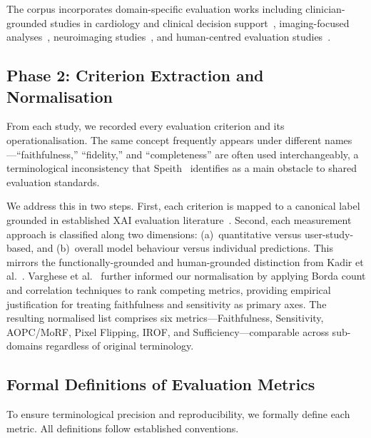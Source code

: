 The corpus incorporates domain-specific evaluation works including clinician-grounded studies in cardiology and clinical decision support~\cite{Vazquez2021,Piculin2022,Nurmaini2022,MorenoSanchez2023,Pandey2024}, imaging-focused analyses~\cite{Lee2021Cardiomegaly,palatnik2021xai,Repetto2025EvaluatingTR,Pertuz2023,Patricio2024}, neuroimaging studies~\cite{Nazir2024UtilizingCC,Chmiel2023,Kohan2025}, and human-centred evaluation studies~\cite{IhongbeFouad2024,11355720}.

\subsection{Phase 2: Criterion Extraction and Normalisation}

From each study, we recorded every evaluation criterion and its operationalisation. The same concept frequently appears under different names---``faithfulness,'' ``fidelity,'' and ``completeness'' are often used interchangeably, a terminological inconsistency that Speith~\cite{speith2022review} identifies as a main obstacle to shared evaluation standards.

We address this in two steps. First, each criterion is mapped to a canonical label grounded in established XAI evaluation literature~\cite{rosenfeld2021better,kadir2023evaluation}. Second, each measurement approach is classified along two dimensions: (a)~quantitative versus user-study-based, and (b)~overall model behaviour versus individual predictions. This mirrors the functionally-grounded and human-grounded distinction from Kadir et al.~\cite{kadir2023evaluation}. Varghese et al.~\cite{Varghese2025OnDE} further informed our normalisation by applying Borda count and correlation techniques to rank competing metrics, providing empirical justification for treating faithfulness and sensitivity as primary axes. The resulting normalised list comprises six metrics---Faithfulness, Sensitivity, AOPC/MoRF, Pixel Flipping, IROF, and Sufficiency---comparable across sub-domains regardless of original terminology.

\subsection{Formal Definitions of Evaluation Metrics}

To ensure terminological precision and reproducibility, we formally define each metric. All definitions follow established conventions.

